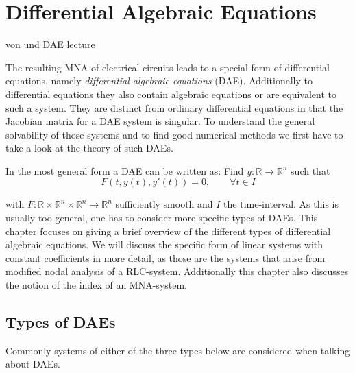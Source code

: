 \chapter{Differential Algebraic Equations}

von \cite{NumerikGewöhnlicherDifferentialgleichungen} und DAE lecture

The resulting MNA of electrical circuits leads to a special form of differential equations, namely \emph{differential algebraic equations} (DAE). Additionally to differential equations they also contain algebraic equations or are equivalent to such a system. They are distinct from ordinary differential equations in that the Jacobian matrix for a DAE system is singular. 
To understand the general solvability of those systems and to find good numerical methods we first have to take a look at the theory of such DAEs.

In the most general form a DAE can be written as:
Find $y:\mathbb{R} \to \mathbb{R}^n$ such that
\begin{equation}
	\label{Abstract_DAE}
	F(t, y(t), y'(t)) = 0, \qquad \forall t \in I
\end{equation}

with $F:\mathbb{R} \times \mathbb{R}^n \times \mathbb{R}^n \to \mathbb{R}^n$ sufficiently smooth and $I$ the time-interval. As this is usually too general, one has to consider more specific types of DAEs.
This chapter focuses on giving a brief overview of the different types of differential algebraic equations. We will discuss the specific form of linear systems with constant coefficients in more detail, as those are the systems that arise from modified nodal analysis of a RLC-system. Additionally this chapter also discusses the notion of the index of an MNA-system.

\section{Types of DAEs}

	Commonly systems of either of the three types below are considered when talking about DAEs.
	
